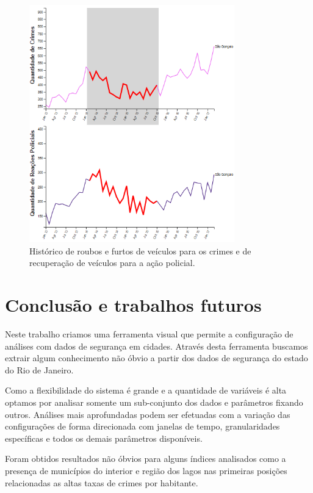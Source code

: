 \documentclass[10pt,conference]{IEEEtran}
\begin{document}
\begin{figure}[!t]
\centering
\includegraphics[width=3.5in]{relacaoRouboFurtoVeiculoRecuperacao.png}
\caption{Histórico de roubos e furtos de veículos para os crimes e de recuperação de veículos para a ação policial.}
\label{fig_relacaoVeiculos}
\end{figure}

\section{Conclusão e trabalhos futuros}

Neste trabalho criamos uma ferramenta visual que permite a configuração de análises com dados de segurança em cidades. Através desta ferramenta buscamos extrair algum conhecimento não óbvio a partir dos dados de segurança do estado do Rio de Janeiro. 

Como a flexibilidade do sistema é grande e a quantidade de variáveis é alta optamos por analisar somente um sub-conjunto dos dados e parâmetros fixando outros. Análises mais aprofundadas podem ser efetuadas com a variação das configurações de forma direcionada com janelas de tempo, granularidades específicas e todos os demais parâmetros disponíveis.

Foram obtidos resultados não óbvios para alguns índices analisados como a presença de municípios do interior e região dos lagos nas primeiras posições relacionadas as altas taxas de crimes por habitante.  
\end{document}

